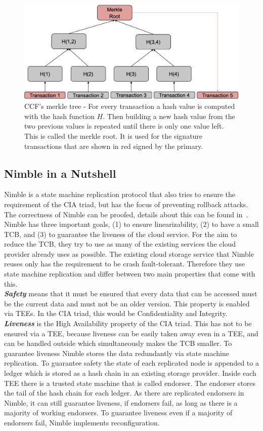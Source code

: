 \begin{figure}[t]
	\includegraphics[scale=0.17]{pictures/merkle_new}
	\caption{CCF's merkle tree - For every transaction a hash value is computed with the hash function $H$. Then building a new hash value from the two previous values is repeated until there is only one value left. This is called the merkle root. It is used for the signature transactions that are shown in red signed by the primary.}
	\label{merkle}
\end{figure}



\subsection{Nimble in a Nutshell}
Nimble is a state machine replication protocol that also tries to ensure the requirement of the CIA triad, but has the focus of preventing rollback attacks. The correctness of Nimble can be proofed, details about this can be found in~\cite{Nimble}.\\
Nimble has three important goals, (1) to ensure linearizability, (2) to have a small TCB, and (3) to guarantee the liveness of the cloud service. For the aim to reduce the TCB, they try to use as many of the existing services the cloud provider already uses as possible. The existing cloud storage service that Nimble reuses only has the requirement to be crash fault-tolerant. Therefore they use state machine replication and differ between two main properties that come with this.\\
	\textbf{\textit{Safety}} means that it must be ensured that every data that can be accessed must be the current data and must not be an older version. This property is enabled via TEEs. In the CIA triad, this would be Confidentiality and Integrity.\\
	\textbf{\textit{Liveness}} is the High Availability property of the CIA triad. This has not to be ensured via a TEE, because liveness can be easily taken away even in a TEE, and can be handled outside which simultaneously makes the TCB smaller.
	To guarantee liveness Nimble stores the data redundantly via state machine replication. To guarantee safety the state of each replicated node is appended to a ledger which is stored as a hash chain in an existing storage provider. Inside each TEE there is a trusted state machine that is called endorser. The endorser stores the tail of the hash chain for each ledger. As there are replicated endorsers in Nimble, it can still guarantee liveness, if endorsers fail, as long as there is a majority of working endorsers. To guarantee liveness even if a majority of endorsers fail, Nimble implements reconfiguration. 
